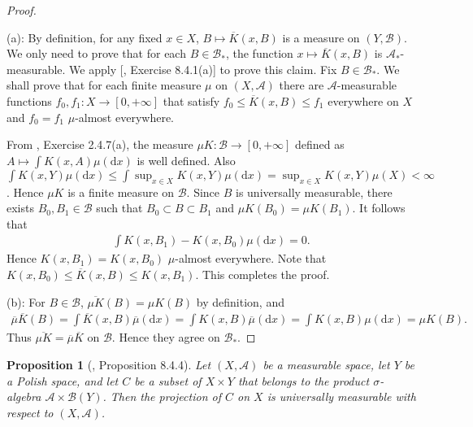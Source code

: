 \documentclass[11pt]{article}
\theoremstyle{plain}
\newtheorem{proposition}{Proposition}
\theoremstyle{definition}
\theoremstyle{remark}
\begin{document}
\begin{proof}
\

\noindent(a):
By definition, for any fixed $x \in X$, $B \mapsto \overline K (x,B)$ is a measure on $(Y, \mathscr B)$.
We only need to prove that for each $B \in \mathscr B_*$, the function $x\mapsto \overline K (x, B)$ is $\mathscr A_*$-measurable.
We apply [\cite{book:992991}, Exercise 8.4.1(a)] to prove this claim.
Fix $B \in \mathscr B_*$.
We shall prove that for each finite measure $\mu $ on $(X,\mathscr A)$ there are $\mathscr A$-measurable functions $f_0, f_1 : X \to [0,+\infty]$ that satisfy $f_0 \leq \overline K (x,B) \leq f_1$ everywhere on $X$ and $f_0=f_1$ $\mu$-almost everywhere.

From
\cite{book:992991}, Exercise 2.4.7(a),
the measure $\mu K : \mathscr B \to [0,+\infty]$ defined as $ A  \mapsto \int K(x, A) \mu (\mathrm d x)$ is well defined.
Also $\int K(x, Y) \mu (\mathrm d x) \leq  \int \sup_{x\in X} K(x, Y) \mu (\mathrm d x) = \sup_{x\in X} K(x, Y) \mu (X) <\infty$.
Hence $\mu K$ is a finite measure on $\mathscr B$.
Since $B$ is universally measurable, there exists $B_0, B_1 \in \mathscr B$ such that $B_0\subset B \subset B_1$ and $\mu K (B_0) = \mu K (B_1)$.
It follows that
\begin{align*}
    \int K(x, B_1 ) -  K(x, B_0 ) \mu (\mathrm d x) =0.
\end{align*} 
Hence $ K(x, B_1  ) = K(x, B_0 )$ $\mu$-almost everywhere.
Note that $K(x,B_0)  \leq \overline K (x, B) \leq K(x, B_1)$.
This completes the proof.

\noindent(b):
For $B \in \mathscr B$, $\overline{ \mu K } (B) = \mu K (B)$ by definition, and 
\begin{align*}
    \overline \mu \overline K (B) =
    \int \overline K (x,B) \overline \mu (\mathrm d x)
    =
    \int  K (x,B) \overline \mu (\mathrm d x)
    =
    \int  K (x,B)  \mu (\mathrm d x)
    =\mu K (B)
    .
\end{align*}
Thus $\overline{\mu K}= \overline \mu \overline K $ on $\mathscr B$.
Hence they agree on $\mathscr B_*$.
    
\end{proof}




\begin{proposition}[\cite{book:992991}, Proposition 8.4.4]
    Let $(X, \mathscr A)$ be a measurable space, let $Y$ be a Polish space, and let $C$ be a subset of $X \times Y$ that belongs to the product $\sigma$-algebra $\mathscr A \times \mathscr B(Y)$.
    Then the projection of $C$ on $X$ is universally measurable with respect to $(X, \mathscr A)$.
\end{proposition}
\end{document}
